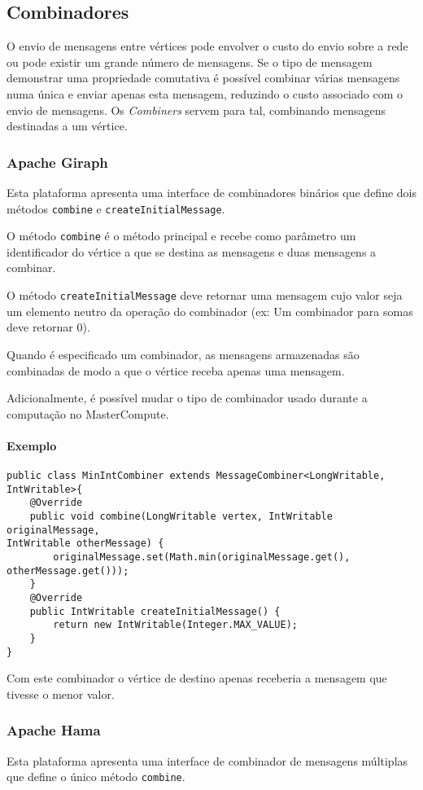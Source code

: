 \newpage
\subsection{Combinadores}
O envio de mensagens entre vértices pode envolver o custo do envio sobre a rede ou pode existir um grande número de mensagens. Se o tipo de mensagem demonstrar uma propriedade comutativa é possível combinar várias mensagens numa única e enviar apenas esta mensagem, reduzindo o custo associado com o envio de mensagens. Os \textit{Combiners} servem para tal, combinando mensagens destinadas a um vértice.

\subsubsection*{Apache Giraph}
Esta plataforma apresenta uma interface de combinadores binários que define dois métodos \texttt{combine} e \texttt{createInitialMessage}.

O método \texttt{combine} é o método principal e recebe como parâmetro um identificador do vértice a que se destina as mensagens e duas mensagens a combinar.

O método \texttt{createInitialMessage} deve retornar uma mensagem cujo valor seja um elemento neutro da operação do combinador (ex: Um combinador para somas deve retornar 0).

Quando é especificado um combinador, as mensagens armazenadas são combinadas de modo a que o vértice receba apenas uma mensagem.

Adicionalmente, é possível mudar o tipo de combinador usado durante a computação no MasterCompute.

\paragraph{Exemplo}
\begin{verbatim}
public class MinIntCombiner extends MessageCombiner<LongWritable, IntWritable>{
	@Override
	public void combine(LongWritable vertex, IntWritable originalMessage, 
IntWritable otherMessage) {
		originalMessage.set(Math.min(originalMessage.get(), 
otherMessage.get()));
	}
	@Override
	public IntWritable createInitialMessage() {
		return new IntWritable(Integer.MAX_VALUE);
	}
}
\end{verbatim}

Com este combinador o vértice de destino apenas receberia a mensagem que 
tivesse o menor valor.

\subsubsection*{Apache Hama}
Esta plataforma apresenta uma interface de combinador de mensagens múltiplas que define o único método \texttt{combine}.

